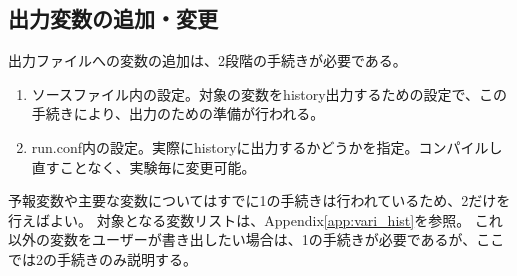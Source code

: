 \subsection{出力変数の追加・変更}
出力ファイルへの変数の追加は、2段階の手続きが必要である。
\begin{enumerate}
\item ソースファイル内の設定。対象の変数をhistory出力するための設定で、この手続きにより、出力のための準備が行われる。
\item run.conf内の設定。実際にhistoryに出力するかどうかを指定。コンパイルし直すことなく、実験毎に変更可能。
\end{enumerate}
予報変数や主要な変数についてはすでに1の手続きは行われているため、2だけを行えばよい。
対象となる変数リストは、Appendix\ref{app:vari_hist}を参照。
これ以外の変数をユーザーが書き出したい場合は、1の手続きが必要であるが、ここでは2の手続きのみ説明する。


